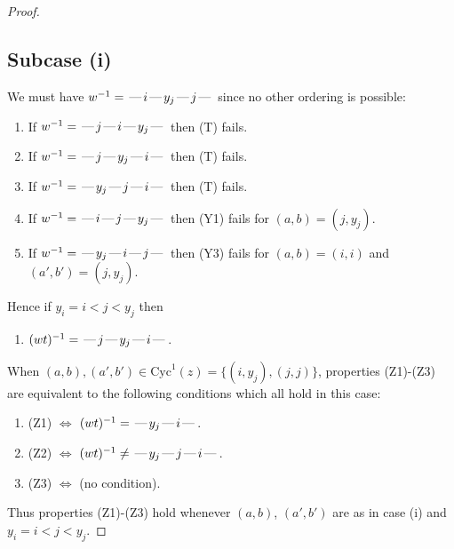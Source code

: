 \documentclass[10pt]{article}
\theoremstyle{definition}
\theoremstyle{definition}
\def\dash{\text{\hspace{0.5mm}---\hspace{0.5mm}}}
\def\Cyc{\mathrm{Cyc}}
\begin{document}
\begin{proof}
\subsection{Subcase (i)}
We must have $w^{-1} = \dash i\dash y_j\dash j\dash $
since no other ordering is possible:
\begin{enumerate}
\item If $w^{-1} = \dash j\dash i\dash y_j\dash $ then (T) fails.
\item If $w^{-1} = \dash j\dash y_j\dash i\dash $ then (T) fails.
\item If $w^{-1} = \dash y_j\dash j\dash i\dash $ then (T) fails.
\item If $w^{-1} = \dash i\dash j\dash y_j\dash $ then (Y1) fails for $(a,b)=(j,y_j)$.
\item If $w^{-1} = \dash y_j\dash i\dash j\dash $ then (Y3) fails for $(a,b)=(i,i)$ and $(a',b')=(j,y_j)$.
\end{enumerate}
Hence if $y_i = i < j < y_j$ then \begin{enumerate}\item[] $(wt)^{-1} = \dash j\dash y_j\dash i\dash $. \end{enumerate}
When $(a,b),(a',b')\in\Cyc^1(z)= \{(i,y_j),(j,j)\}$,
properties (Z1)-(Z3) are equivalent to the following conditions which all hold in this case:
\begin{enumerate}
\item[](Z1) $\Leftrightarrow$ $(wt)^{-1} = \dash y_j \dash i \dash$.
\item[](Z2) $\Leftrightarrow$ $(wt)^{-1} \neq \dash y_j \dash j \dash i \dash$.
\item[](Z3) $\Leftrightarrow$ (no condition).
\end{enumerate}
Thus properties (Z1)-(Z3) hold whenever $(a,b)$, $(a',b')$ are as in case (i) and $y_i = i < j < y_j$.

\end{proof}
\end{document}

